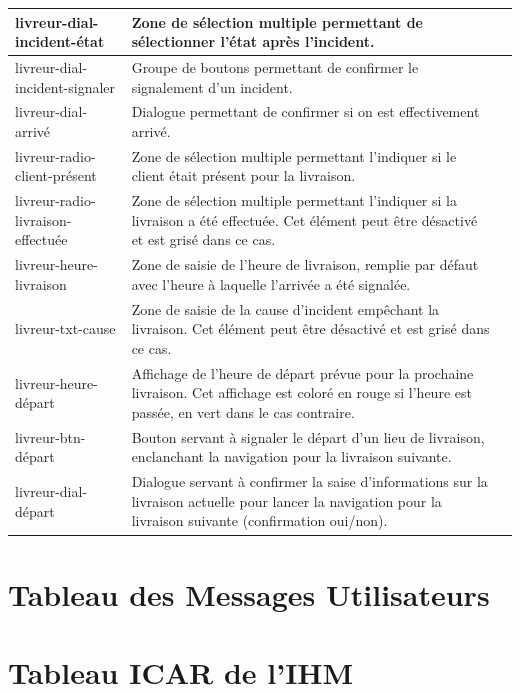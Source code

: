 \documentclass{report}
\begin{document}
\begin{longtable}{|p{5cm}|p{5cm}|c|}
livreur-dial-incident-état&Zone de sélection multiple permettant de sélectionner l'état après l'incident.&\\\hline
livreur-dial-incident-signaler&Groupe de boutons permettant de confirmer le signalement d'un incident.&\\\hline
livreur-dial-arrivé&Dialogue permettant de confirmer si on est effectivement arrivé.&\\\hline
livreur-radio-client-présent&Zone de sélection multiple permettant l'indiquer si le client était présent pour la livraison.&\\\hline
livreur-radio-livraison-effectuée&Zone de sélection multiple permettant l'indiquer si la livraison a été effectuée. Cet élément peut être désactivé et est grisé dans ce cas.&\\\hline
livreur-heure-livraison&Zone de saisie de l'heure de livraison, remplie par défaut avec l'heure à laquelle l'arrivée a été signalée.&\\\hline
livreur-txt-cause&Zone de saisie de la cause d'incident empêchant la livraison. Cet élément peut être désactivé et est grisé dans ce cas.&\\\hline
livreur-heure-départ&Affichage de l'heure de départ prévue pour la prochaine livraison. Cet affichage est coloré en rouge si l'heure est passée, en vert dans le cas contraire.&\\\hline
livreur-btn-départ&Bouton servant à signaler le départ d'un lieu de livraison, enclanchant la navigation pour la livraison suivante.&\\\hline
livreur-dial-départ&Dialogue servant à confirmer la saise d'informations sur la livraison actuelle pour lancer la navigation pour la livraison suivante (confirmation oui/non).&\\\hline
\end{longtable}



\section{Tableau des Messages Utilisateurs}

\section{Tableau ICAR de l'IHM}
\end{document}
